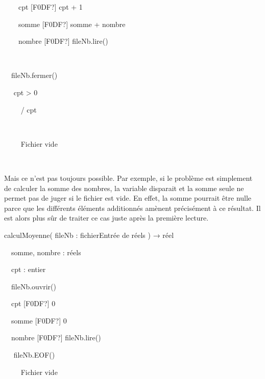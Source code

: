 {\sffamily
\ \ \ \ cpt {\textrm{[F0DF?]}} cpt + 1}

{\sffamily
\ \ \ \ somme {\textrm{[F0DF?]}} somme + nombre}

{\sffamily
\ \ \ \ nombre {\textrm{[F0DF?]}} fileNb.lire()}

{\sffamily
\ \   }

{\sffamily
\ \ fileNb.fermer()}

{\sffamily
\ \  cpt {\textgreater} 0 }

{\sffamily
\ \ \ \  / cpt}

{\sffamily
\ \ }

{\sffamily
\ \ \ \  {\textquotedbl}Fichier
vide{\textquotedbl}}

{\sffamily
\ \  }

{\sffamily
{} }

{
Mais ce n'est pas toujours possible. Par exemple, si le
problème est simplement de calculer la somme des nombres, la variable
 disparait et la somme seule ne permet pas de
juger si le fichier est vide. En effet, la somme pourrait être nulle
parce que les différents éléments additionnés amènent précisément à ce
résultat. Il est alors plus sûr de traiter ce cas juste après la
première lecture.}

{\sffamily
{} calculMoyenne( fileNb : fichierEntrée de réels )
{→} réel}


\bigskip

{\sffamily
\ \ somme, nombre : réels}

{\sffamily
\ \ cpt : entier}


\bigskip

{\sffamily
\ \ fileNb.ouvrir()}

{\sffamily
\ \ cpt {\textrm{[F0DF?]}} 0}

{\sffamily
\ \ somme {\textrm{[F0DF?]}} 0}

{\sffamily
\ \ nombre {\textrm{[F0DF?]}} fileNb.lire()}


\bigskip

{\sffamily
\ \  fileNb.EOF() }

{\sffamily
\textstyleMotCl{\ \ \ \ }}

{\sffamily
\ \ \ \  {\textquotedbl}Fichier
vide{\textquotedbl}}

